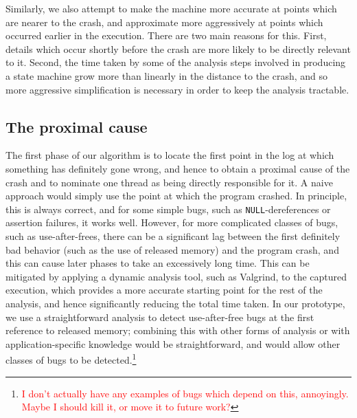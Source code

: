 \documentclass[10pt,twocolumn,preprint,natbib,authoryear]{sigplanconf}
\newcommand{\editorial}[1]{\textcolor{red}{\footnote{\textcolor{red}{#1}}}}
\begin{document}
Similarly, we also attempt to make the machine more accurate at points
which are nearer to the crash, and approximate more aggressively at
points which occurred earlier in the execution.  There are two main
reasons for this.  First, details which occur shortly before the crash
are more likely to be directly relevant to it.  Second, the time taken
by some of the analysis steps involved in producing a state machine
grow more than linearly in the distance to the crash, and so more
aggressive simplification is necessary in order to keep the analysis
tractable.

\subsection{The proximal cause}
The first phase of our algorithm is to locate the first point in the
log at which something has definitely gone wrong, and hence to obtain
a proximal cause of the crash and to nominate one thread as being
directly responsible for it.  A naive approach would simply use the
point at which the program crashed.  In principle, this is always
correct, and for some simple bugs, such as \verb|NULL|-dereferences or
assertion failures, it works well.  However, for more complicated
classes of bugs, such as use-after-frees, there can be a significant
lag between the first definitely bad behavior (such as the use of
released memory) and the program crash, and this can cause later
phases to take an excessively long time.  This can be mitigated by
applying a dynamic analysis tool, such as
Valgrind\cite{Nethercote2007}, to the captured execution, which
provides a more accurate starting point for the rest of the analysis,
and hence significantly reducing the total time taken.  In our
prototype, we use a straightforward analysis to detect use-after-free
bugs at the first reference to released memory; combining this with
other forms of analysis or with application-specific knowledge would
be straightforward, and would allow other classes of bugs to be
detected.\editorial{I don't actually have any examples of bugs which
  depend on this, annoyingly.  Maybe I should kill it, or move it to
  future work?}
\end{document}
